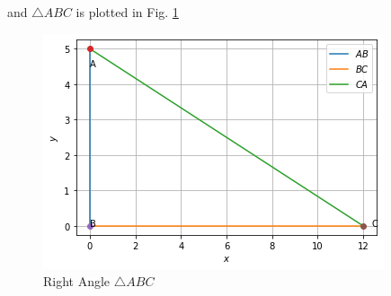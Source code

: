 and  $\triangle ABC$ is plotted in Fig. \ref{constr/6/fig:right_angle_triangle}	
%
\begin{figure}[!ht]
\centering
\includegraphics[width=\columnwidth]{solutions/6/figure1.png}
\caption{Right Angle $\triangle ABC$}
\label{constr/6/fig:right_angle_triangle}	
\end{figure}